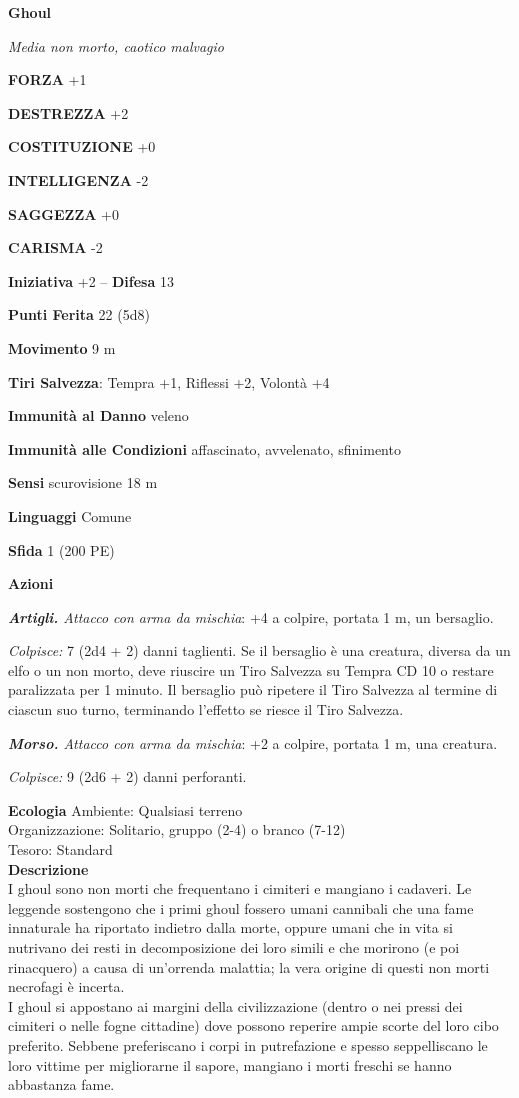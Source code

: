 \begin{multicols}{2}
\medskip{}\textbf{Ghoul}

\emph{Media non morto, caotico malvagio}

\textbf{FORZA} +1

\textbf{DESTREZZA} +2

\textbf{COSTITUZIONE} +0

\textbf{INTELLIGENZA} -2

\textbf{SAGGEZZA} +0

\textbf{CARISMA} -2

\textbf{Iniziativa} +2 -- \textbf{Difesa} 13

\textbf{Punti Ferita} 22 (5d8)

\textbf{Movimento} 9 m

\textbf{Tiri Salvezza}: Tempra +1, Riflessi +2, Volontà +4

\textbf{Immunità al Danno} veleno

\textbf{Immunità alle Condizioni} affascinato, avvelenato, sfinimento

\textbf{Sensi} scurovisione 18 m

\textbf{Linguaggi} Comune

\textbf{Sfida} 1 (200 PE)

\textbf{Azioni}

\emph{\textbf{Artigli.} Attacco con arma da mischia}: +4 a colpire, portata 1 m, un bersaglio.

\emph{Colpisce:} 7 (2d4 + 2) danni taglienti. Se il bersaglio è una creatura, diversa da un elfo o un non morto, deve riuscire un Tiro Salvezza su Tempra CD 10 o restare paralizzata per 1 minuto. Il bersaglio può ripetere il Tiro Salvezza al termine di ciascun suo turno, terminando l'effetto se riesce il Tiro Salvezza.

\emph{\textbf{Morso.} Attacco con arma da mischia}: +2 a colpire, portata 1 m, una creatura.

\emph{Colpisce:} 9 (2d6 + 2) danni perforanti.

\textbf{Ecologia}
Ambiente: Qualsiasi terreno\\
Organizzazione: Solitario, gruppo (2-4) o branco (7-12)\\
Tesoro: Standard\\
\textbf{Descrizione}\\
I ghoul sono non morti che frequentano i cimiteri e mangiano i cadaveri. Le leggende sostengono che i primi ghoul fossero umani cannibali che una fame innaturale ha riportato indietro dalla morte, oppure umani che in vita si nutrivano dei resti in decomposizione dei loro simili e che morirono (e poi rinacquero) a causa di un'orrenda malattia; la vera origine di questi non morti necrofagi è incerta.\\
I ghoul si appostano ai margini della civilizzazione (dentro o nei pressi dei cimiteri o nelle fogne cittadine) dove possono reperire ampie scorte del loro cibo preferito. Sebbene preferiscano i corpi in putrefazione e spesso seppelliscano le loro vittime per migliorarne il sapore, mangiano i morti freschi se hanno abbastanza fame.\\


\end{multicols}

